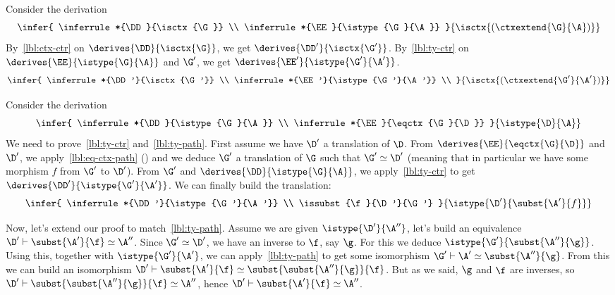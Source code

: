 
Consider the derivation
%
%
\begin{equation*}
  \infer{
    \inferrule*{\DD}{\isctx{\G}} \\
    \inferrule*{\EE}{\istype{\G}{\A}}
  }
  {\isctx{(\ctxextend{\G}{\A})}}
\end{equation*}
%
By~\eqref{lbl:ctx-ctr} on $\derives{\DD}{\isctx{\G}}$, we get
$\derives{\DD'}{\isctx{\G'}}$.
By~\eqref{lbl:ty-ctr} on $\derives{\EE}{\istype{\G}{\A}}$ and $\G'$, we get
$\derives{\EE'}{\istype{\G'}{\A'}}$.
%
\begin{equation*}
  \infer{
    \inferrule*{\DD'}{\isctx{\G'}} \\
    \inferrule*{\EE'}{\istype{\G'}{\A'}} \\
  }
  {\isctx{(\ctxextend{\G'}{\A'})}}
\end{equation*}



Consider the derivation
%
%
\begin{equation*}
  \infer{
    \inferrule*{\DD}{\istype{\G}{\A}} \\
    \inferrule*{\EE}{\eqctx{\G}{\D}}
  }
  {\istype{\D}{\A}}
\end{equation*}
%
We need to prove~\eqref{lbl:ty-ctr} and~\eqref{lbl:ty-path}.
First assume we have $\D'$ a translation of $\D$.
From $\derives{\EE}{\eqctx{\G}{\D}}$ and $\D'$, we
apply~\eqref{lbl:eq-ctx-path} () and we deduce
$\G'$ a translation of $\G$ such that $\G' \simeq \D'$ (meaning that in
particular we have some morphism $f$ from $\G'$ to $\D'$).
From $\G'$ and $\derives{\DD}{\istype{\G}{\A}}$, we apply~\eqref{lbl:ty-ctr}
to get $\derives{\DD'}{\istype{\G'}{\A'}}$.
We can finally build the translation:
%
\begin{equation*}
  \infer{
    \inferrule*{\DD'}{\istype{\G'}{\A'}} \\
    \issubst{\f}{\D'}{\G'}
  }
  {\istype{\D'}{\subst{\A'}{f}}}
\end{equation*}
%

Now, let's extend our proof to match~\eqref{lbl:ty-path}.
Assume we are given $\istype{\D'}{\A''}$, let's build an equivalence
$\D' \vdash \subst{\A'}{\f} \simeq \A''$.
Since $\G' \simeq \D'$, we have an inverse to $\f$, say $\g$.
For this we deduce $\istype{\G'}{\subst{\A''}{\g}}$.
Using this, together with $\istype{\G'}{\A'}$, we can apply~\eqref{lbl:ty-path}
to get some isomorphism $\G' \vdash \A' \simeq \subst{\A''}{\g}$.
From this we can build an isomorphism
$\D' \vdash \subst{\A'}{\f} \simeq \subst{\subst{\A''}{\g}}{\f}$.
But as we said, $\g$ and $\f$ are inverses, so
$\D' \vdash \subst{\subst{\A''}{\g}}{\f} \simeq \A''$, hence
$\D' \vdash \subst{\A'}{\f} \simeq \A''$.

